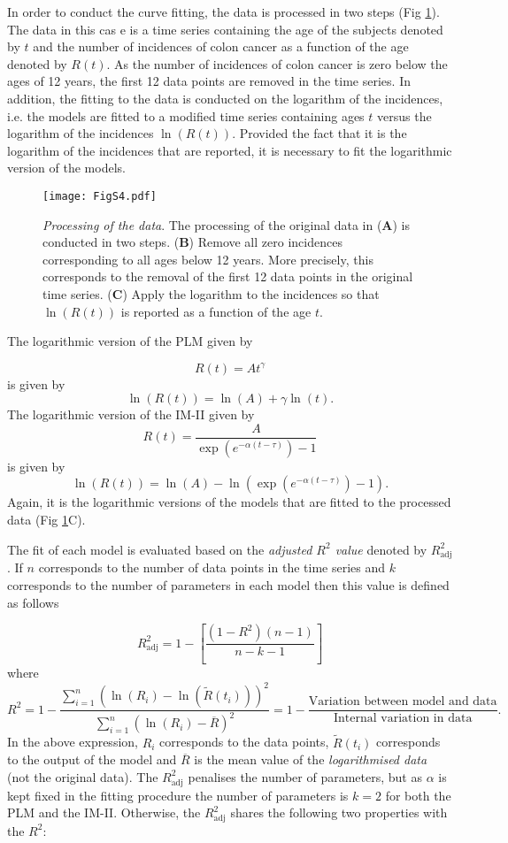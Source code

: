 In order to conduct the curve fitting, the data is processed in two steps (Fig \ref{fig:data_processing}). The data in this cas e is a time series containing the age of the subjects denoted by $t$ and the number of incidences of colon cancer as a function of the age denoted by $R(t)$. As the number of incidences of colon cancer is zero below the ages of 12 years, the first 12 data points are removed in the time series. In addition, the fitting to the data is conducted on the logarithm of the incidences, i.e. the models are fitted to a modified time series containing ages $t$ versus the logarithm of the incidences $\ln\left(R(t)\right)$. Provided the fact that it is the logarithm of the incidences that are reported, it is necessary to fit the logarithmic version of the models. 


\begin{figure}[htbp!]
  \texttt{[image: FigS4.pdf]}
  \caption[Processing of the data]{\textit{Processing of the data}. The processing of the original data in (\textbf{A}) is conducted in two steps. (\textbf{B}) Remove all zero incidences corresponding to all ages below 12 years. More precisely, this corresponds to the removal of the first 12 data points in the original time series. (\textbf{C}) Apply the logarithm to the incidences so that $\ln\left(R(t)\right)$ is reported as a function of the age $t$.}
  \label{fig:data_processing}
  \end{figure}

  The logarithmic version of the PLM given by

  $$R(t)=At^{\gamma}$$
  is given by
  $$\ln\left(R(t)\right)=\ln(A)+\gamma\ln(t).$$
  The logarithmic version of the IM-II given by
  $$R(t)=\dfrac{A}{\exp\left(e^{-\alpha(t-\tau)}\right)-1}$$
  is given by
  $$\ln\left(R(t)\right)=\ln(A)-\ln\left(\exp\left(e^{-\alpha(t-\tau)}\right)-1\right).$$
  Again, it is the logarithmic versions of the models that are fitted to the processed data (Fig \ref{fig:data_processing}C).


  The fit of each model is evaluated based on the \textit{adjusted $R^2$ value} denoted by $R^2_{\mathrm{adj}}$. If $n$ corresponds to the number of data points in the time series and $k$ corresponds to the number of parameters in each model then this value is defined as follows

    $$R^2_{\mathrm{adj}}=1-\left[\dfrac{\left(1-R^2\right)\left(n-1\right)}{n-k-1}\right]$$
    where\vspace{-0.3cm}
    $$R^2=1-\dfrac{\sum\limits_{i=1}^{n}\left(\ln\left(R_i\right)-\ln\left(\tilde{R}(t_i)\right)\right)^2}{\sum\limits_{i=1}^{n}\left(\ln\left(R_i\right)-\overline{R}\right)^2}=1-\dfrac{\textrm{Variation between model and data}}{\textrm{Internal variation in data}}.$$
In the above expression, $R_i$ corresponds to the data points, $\tilde{R}(t_i)$ corresponds to the output of the model and $\overline{R}$ is the mean value of the \textit{logarithmised data} (not the original data). The $R^2_{\mathrm{adj}}$ penalises the number of parameters, but as $\alpha$ is kept fixed in the fitting procedure the number of parameters is $k=2$ for both the PLM and the IM-II. Otherwise, the $R^2_{\mathrm{adj}}$ shares the following two properties with the $R^2$:


